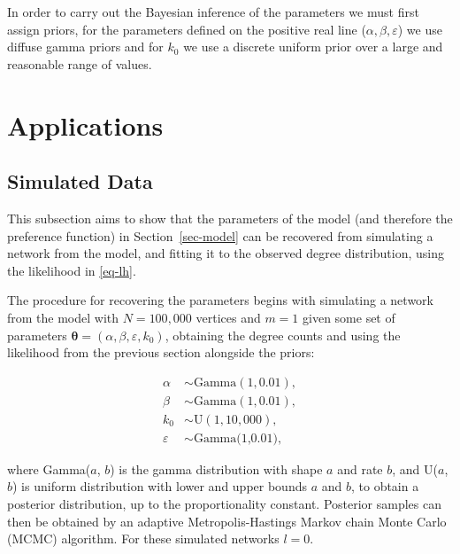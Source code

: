 \documentclass[
  sn-basic,
  10pt,
]{sn-jnl}
\theoremstyle{plain}
\theoremstyle{plain}
\theoremstyle{remark}
\begin{document}
In order to carry out the Bayesian inference of the parameters we must
first assign priors, for the parameters defined on the positive real
line (\(\alpha, \beta,\varepsilon\)) we use diffuse gamma priors and for
\(k_0\) we use a discrete uniform prior over a large and reasonable
range of values.

\section{Applications}\label{applications}

\subsection{Simulated Data}\label{sec-sim}

This subsection aims to show that the parameters of the model (and
therefore the preference function) in Section~\ref{sec-model} can be
recovered from simulating a network from the model, and fitting it to
the observed degree distribution, using the likelihood in \eqref{eq-lh}.

The procedure for recovering the parameters begins with simulating a
network from the model with \(N=100,000\) vertices and \(m=1\) given
some set of parameters
\(\pmb\theta = (\alpha, \beta, \varepsilon, k_0)\), obtaining the degree
counts and using the likelihood from the previous section alongside the
priors:

\begin{align*}
\alpha&\sim \text{Gamma}(1,0.01),\\
\beta &\sim  \text{Gamma}(1,0.01),\\
k_0 &\sim \text{U}(1,10,000),\\
\varepsilon &\sim \text{Gamma(1,0.01)},
\end{align*}

where Gamma(\(a\), \(b\)) is the gamma distribution with shape \(a\) and
rate \(b\), and U(\(a\), \(b\)) is uniform distribution with lower and
upper bounds \(a\) and \(b\), to obtain a posterior distribution, up to
the proportionality constant. Posterior samples can then be obtained by
an adaptive Metropolis-Hastings Markov chain Monte Carlo (MCMC)
algorithm. For these simulated networks \(l=0\).
\end{document}
